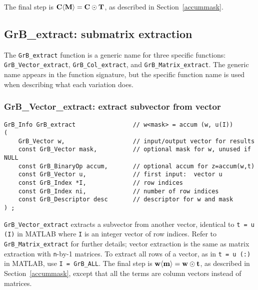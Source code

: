 \documentclass[12pt]{article}
\begin{document}
The final step is ${\bf C \langle M \rangle  = C \odot T}$, as described in
Section~\ref{accummask}.

\newpage
\subsection{{\sf GrB\_extract:} submatrix extraction } %
\label{extract}

The \verb'GrB_extract' function is a generic name for three specific functions:
\verb'GrB_Vector_extract', \verb'GrB_Col_extract', and
\verb'GrB_Matrix_extract'.  The generic name appears in the function signature,
but the specific function name is used when describing what each variation
does.

\subsubsection{{\sf GrB\_Vector\_extract:} extract subvector from vector}
\label{extract_vector}

\begin{mdframed}[userdefinedwidth=6in]
{\footnotesize
\begin{verbatim}
GrB_Info GrB_extract                // w<mask> = accum (w, u(I))
(
    GrB_Vector w,                   // input/output vector for results
    const GrB_Vector mask,          // optional mask for w, unused if NULL
    const GrB_BinaryOp accum,       // optional accum for z=accum(w,t)
    const GrB_Vector u,             // first input:  vector u
    const GrB_Index *I,             // row indices
    const GrB_Index ni,             // number of row indices
    const GrB_Descriptor desc       // descriptor for w and mask
) ;
\end{verbatim} } \end{mdframed}

\verb'GrB_Vector_extract' extracts a subvector from another vector, identical
to \verb't = u (I)' in MATLAB where \verb'I' is an integer vector of row
indices.  Refer to \verb'GrB_Matrix_extract' for further details; vector
extraction is the same as matrix extraction with \verb'n'-by-1 matrices.  To
extract all rows of a vector, as in \verb't = u (:)' in MATLAB, use
\verb'I = GrB_ALL'.  The final step is ${\bf w \langle m \rangle  = w \odot
t}$, as described in Section~\ref{accummask}, except that all the terms are
column vectors instead of matrices.
\end{document}
